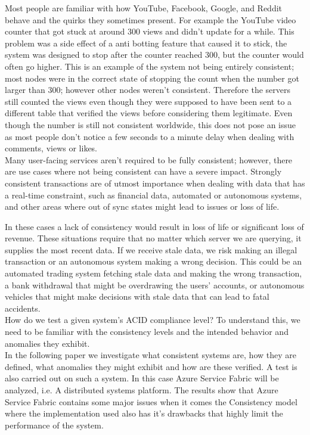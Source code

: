 \documentclass[a4paper,10pt,titlepage]{report}
\begin{document}
    Most people are familiar with how YouTube, Facebook, Google, and Reddit behave and the quirks they sometimes present.
    For example the YouTube video counter that got stuck at around 300 views and didn't update for a while. This problem was a side effect of a anti botting feature that caused it to stick, the system was designed to stop after the counter reached 300, but the counter would often go higher. This is an example of the system not being entirely consistent; most nodes were in the correct state of stopping the count when the number got larger than 300; however other nodes weren't consistent. Therefore the servers still counted the views even though they were supposed to have been sent to a different table that verified the views before considering them legitimate. Even though the number is still not consistent worldwide, this does not pose an issue as most people don't notice a few seconds to a minute delay when dealing with comments, views or likes.
    \\
    Many user-facing services aren't required to be fully consistent; however, there are use cases where not being consistent can have a severe impact. Strongly consistent transactions are of utmost importance when dealing with data that has a real-time constraint, such as financial data, automated or autonomous systems, and other areas where out of sync states might lead to issues or loss of life.

    In these cases a lack of consistency would result in loss of life or significant loss of revenue. These situations require that no matter which server we are querying, it supplies the most recent data. If we receive stale data, we risk making an illegal transaction or an autonomous system making a wrong decision. This could be an automated trading system fetching stale data and making the wrong transaction, a bank withdrawal that might be overdrawing the users' accounts, or autonomous vehicles that might make decisions with stale data that can lead to fatal accidents. \\

    \vspace{5mm}
    How do we test a given system's ACID compliance level? To understand this, we need to be familiar with the consistency levels and the intended behavior and anomalies they exhibit.\\
    \vspace{5mm}
    In the following paper we investigate what consistent systems are, how they are defined, what anomalies they might exhibit and how are these verified. A test is also carried out on such a system. In this case Azure Service Fabric will be analyzed, i.e. A distributed systems platform. The results show that Azure Service Fabric contains some major issues when it comes the Consistency model where the implementation used also has it's drawbacks that highly limit the performance of the system.\\
    \vspace{5mm}
    \newpage
\end{document}
